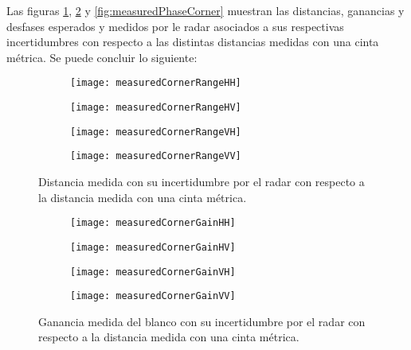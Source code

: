 Las figuras \ref{fig:measuredDistCorner}, \ref{fig:measuredGainCorner} y \ref{fig:measuredPhaseCorner} muestran las distancias, ganancias y desfases esperados y medidos por le radar asociados a sus respectivas incertidumbres con respecto a las distintas distancias medidas con una cinta métrica. Se puede concluir lo siguiente:
\begin{figure}[H]
  \centering
  \begin{subfigure}{0.49\textwidth}
    \texttt{[image: measuredCornerRangeHH]}
  \end{subfigure}
  \begin{subfigure}{0.49\textwidth}
    \texttt{[image: measuredCornerRangeHV]}
  \end{subfigure}

  \begin{subfigure}{0.49\textwidth}
    \texttt{[image: measuredCornerRangeVH]}
  \end{subfigure}
  \begin{subfigure}{0.49\textwidth}
    \texttt{[image: measuredCornerRangeVV]}
  \end{subfigure}
  \caption{Distancia medida con su incertidumbre por el radar con respecto a la distancia medida con una cinta métrica.}
  \label{fig:measuredDistCorner}
\end{figure}
\begin{figure}[H]
  \centering
  \begin{subfigure}{0.49\textwidth}
    \texttt{[image: measuredCornerGainHH]}
  \end{subfigure}
  \begin{subfigure}{0.49\textwidth}
    \texttt{[image: measuredCornerGainHV]}
  \end{subfigure}

  \begin{subfigure}{0.49\textwidth}
    \texttt{[image: measuredCornerGainVH]}
  \end{subfigure}
  \begin{subfigure}{0.49\textwidth}
    \texttt{[image: measuredCornerGainVV]}
  \end{subfigure}
  \caption{Ganancia medida del blanco con su incertidumbre por el radar con respecto a la distancia medida con una cinta métrica.}
  \label{fig:measuredGainCorner}
\end{figure}
